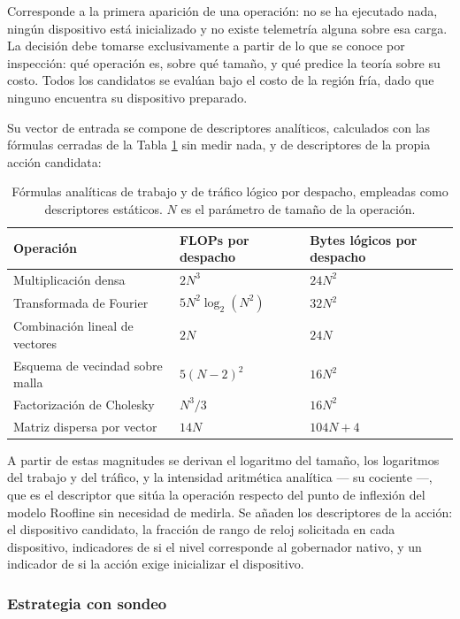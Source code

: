 \documentclass[12pt,oneside,spanish]{book}
\begin{document}
Corresponde a la primera aparición de una operación: no se ha ejecutado nada, ningún dispositivo está inicializado y no existe telemetría alguna sobre esa carga. La decisión debe tomarse exclusivamente a partir de lo que se conoce por inspección: qué operación es, sobre qué tamaño, y qué predice la teoría sobre su costo. Todos los candidatos se evalúan bajo el costo de la región fría, dado que ninguno encuentra su dispositivo preparado.

Su vector de entrada se compone de descriptores analíticos, calculados con las fórmulas cerradas de la Tabla \ref{tab:formulas-analiticas} sin medir nada, y de descriptores de la propia acción candidata:

\begin{table}[H]
\centering
\caption[Fórmulas analíticas de descriptores estáticos]{Fórmulas analíticas de trabajo y de tráfico lógico por despacho, empleadas como descriptores estáticos. $N$ es el parámetro de tamaño de la operación.}
\label{tab:formulas-analiticas}
\begin{tabular}{@{}lll@{}}
\toprule
\textbf{Operación} & \textbf{FLOPs por despacho} & \textbf{Bytes lógicos por despacho} \\
\midrule
Multiplicación densa & $2N^{3}$ & $24N^{2}$ \\
Transformada de Fourier & $5N^{2}\log_{2}(N^{2})$ & $32N^{2}$ \\
Combinación lineal de vectores & $2N$ & $24N$ \\
Esquema de vecindad sobre malla & $5(N-2)^{2}$ & $16N^{2}$ \\
Factorización de Cholesky & $N^{3}/3$ & $16N^{2}$ \\
Matriz dispersa por vector & $14N$ & $104N + 4$ \\
\bottomrule
\end{tabular}
\end{table}

A partir de estas magnitudes se derivan el logaritmo del tamaño, los logaritmos del trabajo y del tráfico, y la intensidad aritmética analítica --- su cociente ---, que es el descriptor que sitúa la operación respecto del punto de inflexión del modelo Roofline sin necesidad de medirla. Se añaden los descriptores de la acción: el dispositivo candidato, la fracción de rango de reloj solicitada en cada dispositivo, indicadores de si el nivel corresponde al gobernador nativo, y un indicador de si la acción exige inicializar el dispositivo.

\subsubsection*{Estrategia con sondeo}
\end{document}
